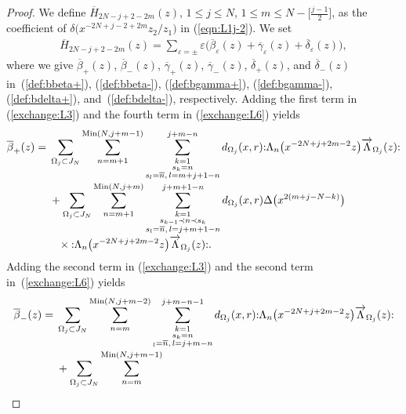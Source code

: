 \documentclass[pdftex]{sigma}
\numberwithin{equation}{section}
\begin{document}
\begin{proof}
{\sloppy We define $\overline{H}_{2N-j+2-2m}(z)$,
$1\leq j \leq N$, $1\leq m \leq N-\big[\frac{j-1}{2}\big]$,
as the coefficient of $\delta\big(x^{-2N+j-2+2m}z_2/z_1\big)$ in (\ref{eqn:L1j-2}).
We set
\begin{gather*}
\overline{H}_{2N-j+2-2m}(z)=\sum_{\varepsilon=\pm}\varepsilon
\big(\overline{\beta}_\varepsilon(z)+\overline{\gamma}_\varepsilon(z)
+\overline{\delta}_\varepsilon(z)\big),
\end{gather*}}%
where we give
$\overline{\beta}_+(z)$, $\overline{\beta}_-(z)$, $\overline{\gamma}_+(z)$,
$\overline{\gamma}_-(z)$, $\overline{\delta}_+(z)$, and $\overline{\delta}_-(z)$
in~(\ref{def:bbeta+}), (\ref{def:bbeta-}), (\ref{def:bgamma+}), (\ref{def:bgamma-}),
(\ref{def:bdelta+}), and~(\ref{def:bdelta-}), respectively.
Adding the first term in (\ref{exchange:L3}) and the fourth term
in (\ref{exchange:L6}) yields
\begin{align}
\overline{\beta}_+(z)={}&\sum_{\Omega_j \subset J_N}
\sum_{n=m+1}^{\operatorname{Min}(N, j+m-1)}
\sum\limits_{\substack{k=1\\s_k=n
\\ s_l=\overline{n},\, l=m+j+1-n}}^{j+m-n}d_{\Omega_j}(x,r)
{:}\Lambda_{n}\big(x^{-2N+j+2m-2}z\big)\overrightarrow{\Lambda}_{\Omega_j}(z){:}\notag
\\[-.5ex]
&+\sum_{\Omega_j \subset J_N}\sum_{n=m+1}^{\operatorname{Min}(N, j+m)}
\sum\limits_{\substack{k=1\\s_{k-1}\prec n \prec s_k
\\ s_l=\overline{n},\, l=j+m+1-n}}^{j+m+1-n}
d_{\Omega_j}(x,r)\Delta\big(x^{2(m+j-N-k)}\big)\notag
\\[-.5ex]
&\phantom{+}\times{:}\Lambda_{n}\big(x^{-2N+j+2m-2}z\big)\overrightarrow{\Lambda}_{\Omega_j}(z){:}.
\label{def:bbeta+}
\end{align}
Adding the second term in (\ref{exchange:L3}) and the second term in~(\ref{exchange:L6}) yields
\begin{align}
\overline{\beta}_-(z)={}&
\sum_{\Omega_j \subset J_N}\sum_{n=m}^{\operatorname{Min}(N, j+m-2)}
\sum\limits_{\substack{k=1\\s_k=n
\\{_l=\overline{n},\, l=j+m-n}}}^{j+m-n-1}
d_{\Omega_j}(x,r)
{:}\Lambda_{n}\big(x^{-2N+j+2m-2}z\big)\overrightarrow{\Lambda}_{\Omega_j}(z){:}\notag
\\[-.5ex]
&+\sum_{\Omega_j \subset J_N}\sum_{n=m}^{\operatorname{Min}(N, j+m-1)}

\end{align}
\end{proof}
\end{document}
